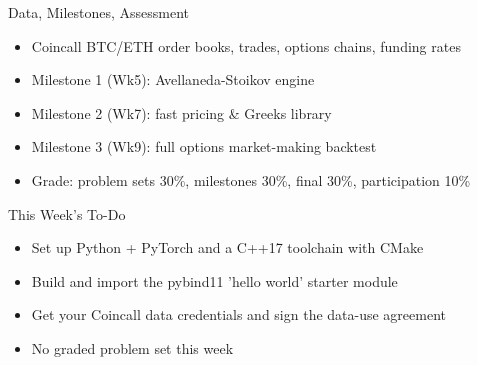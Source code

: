 \documentclass[aspectratio=169,11pt]{beamer}
\begin{document}
\begin{frame}{Data, Milestones, Assessment}
\begin{itemize}
  \item Coincall BTC/ETH order books, trades, options chains, funding rates
  \item Milestone 1 (Wk5): Avellaneda-Stoikov engine
  \item Milestone 2 (Wk7): fast pricing \& Greeks library
  \item Milestone 3 (Wk9): full options market-making backtest
  \item Grade: problem sets 30\%, milestones 30\%, final 30\%, participation 10\%
\end{itemize}\end{frame}
\begin{frame}{This Week's To-Do}
\begin{itemize}
  \item Set up Python + PyTorch and a C++17 toolchain with CMake
  \item Build and import the pybind11 'hello world' starter module
  \item Get your Coincall data credentials and sign the data-use agreement
  \item No graded problem set this week
\end{itemize}\end{frame}
\end{document}
